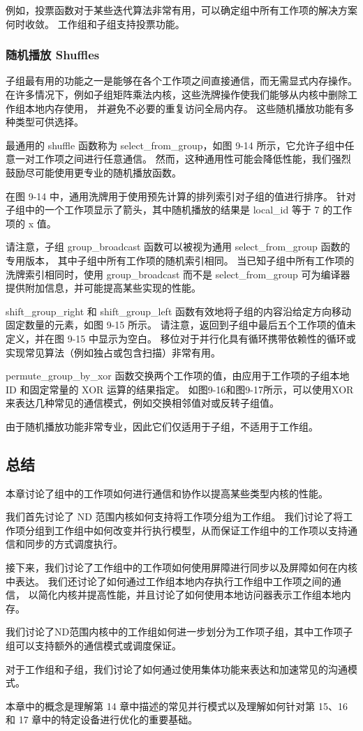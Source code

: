 例如，投票函数对于某些迭代算法非常有用，可以确定组中所有工作项的解决方案何时收敛。 
工作组和子组支持投票功能。

\subsubsection{随机播放 Shuffles}
子组最有用的功能之一是能够在各个工作项之间直接通信，而无需显式内存操作。 
在许多情况下，例如子组矩阵乘法内核，这些洗牌操作使我们能够从内核中删除工作组本地内存使用，
并避免不必要的重复访问全局内存。 这些随机播放功能有多种类型可供选择。

最通用的 shuffle 函数称为 select\_from\_group，如图 9-14 所示，它允许子组中任意一对工作项之间进行任意通信。 
然而，这种通用性可能会降低性能，我们强烈鼓励尽可能使用更专业的随机播放函数。

在图 9-14 中，通用洗牌用于使用预先计算的排列索引对子组的值进行排序。 
针对子组中的一个工作项显示了箭头，其中随机播放的结果是 local\_id 等于 7 的工作项的 x 值。

请注意，子组 group\_broadcast 函数可以被视为通用 select\_from\_group 函数的专用版本，
其中子组中所有工作项的随机索引相同。 
当已知子组中所有工作项的洗牌索引相同时，使用 group\_broadcast 
而不是 select\_from\_group 可为编译器提供附加信息，并可能提高某些实现的性能。

shift\_group\_right 和 shift\_group\_left 函数有效地将子组的内容沿给定方向移动固定数量的元素，如图 9-15 所示。 
请注意，返回到子组中最后五个工作项的值未定义，并在图 9-15 中显示为空白。 
移位对于并行化具有循环携带依赖性的循环或实现常见算法（例如独占或包含扫描）非常有用。

permute\_group\_by\_xor 函数交换两个工作项的值，由应用于工作项的子组本地 ID 和固定常量的 XOR 运算的结果指定。 
如图9-16和图9-17所示，可以使用XOR来表达几种常见的通信模式，例如交换相邻值对或反转子组值。

由于随机播放功能非常专业，因此它们仅适用于子组，不适用于工作组。

\subsection{总结}
本章讨论了组中的工作项如何进行通信和协作以提高某些类型内核的性能。

我们首先讨论了 ND 范围内核如何支持将工作项分组为工作组。 
我们讨论了将工作项分组到工作组中如何改变并行执行模型，从而保证工作组中的工作项以支持通信和同步的方式调度执行。

接下来，我们讨论了工作组中的工作项如何使用屏障进行同步以及屏障如何在内核中表达。 
我们还讨论了如何通过工作组本地内存执行工作组中工作项之间的通信，
以简化内核并提高性能，并且讨论了如何使用本地访问器表示工作组本地内存。

我们讨论了ND范围内核中的工作组如何进一步划分为工作项子组，其中工作项子组可以支持额外的通信模式或调度保证。

对于工作组和子组，我们讨论了如何通过使用集体功能来表达和加速常见的沟通模式。

本章中的概念是理解第 14 章中描述的常见并行模式以及理解如何针对第 15、16 和 17 章中的特定设备进行优化的重要基础。